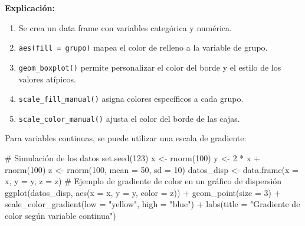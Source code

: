 \documentclass[
  spanish,
  a4paper,
  DIV=11,
  numbers=noendperiod,
  onepage,
  openany]{scrreprt}
\newenvironment{Shaded}{\begin{snugshade}}{\end{snugshade}}
\newcommand{\AttributeTok}[1]{\textcolor[rgb]{0.40,0.45,0.13}{#1}}
\newcommand{\CommentTok}[1]{\textcolor[rgb]{0.37,0.37,0.37}{#1}}
\newcommand{\DecValTok}[1]{\textcolor[rgb]{0.68,0.00,0.00}{#1}}
\newcommand{\FunctionTok}[1]{\textcolor[rgb]{0.28,0.35,0.67}{#1}}
\newcommand{\NormalTok}[1]{\textcolor[rgb]{0.00,0.23,0.31}{#1}}
\newcommand{\OtherTok}[1]{\textcolor[rgb]{0.00,0.23,0.31}{#1}}
\newcommand{\SpecialCharTok}[1]{\textcolor[rgb]{0.37,0.37,0.37}{#1}}
\newcommand{\StringTok}[1]{\textcolor[rgb]{0.13,0.47,0.30}{#1}}
\begin{document}
\textbf{Explicación:}

\begin{enumerate}
\def\labelenumi{\arabic{enumi}.}
\item
  Se crea un data frame con variables categórica y numérica.
\item
  \texttt{aes(fill\ =\ grupo)} mapea el color de relleno a la variable
  de grupo.
\item
  \texttt{geom\_boxplot()} permite personalizar el color del borde y el
  estilo de los valores atípicos.
\item
  \texttt{scale\_fill\_manual()} asigna colores específicos a cada
  grupo.
\item
  \texttt{scale\_color\_manual()} ajusta el color del borde de las
  cajas.
\end{enumerate}

Para variables continuas, se puede utilizar una escala de gradiente:

\begin{Shaded}
\begin{Highlighting}[]
\CommentTok{\# Simulación de los datos}
\FunctionTok{set.seed}\NormalTok{(}\DecValTok{123}\NormalTok{)}
\NormalTok{x }\OtherTok{\textless{}{-}} \FunctionTok{rnorm}\NormalTok{(}\DecValTok{100}\NormalTok{)}
\NormalTok{y }\OtherTok{\textless{}{-}} \DecValTok{2} \SpecialCharTok{*}\NormalTok{ x }\SpecialCharTok{+} \FunctionTok{rnorm}\NormalTok{(}\DecValTok{100}\NormalTok{)}
\NormalTok{z }\OtherTok{\textless{}{-}} \FunctionTok{rnorm}\NormalTok{(}\DecValTok{100}\NormalTok{, }\AttributeTok{mean =} \DecValTok{50}\NormalTok{, }\AttributeTok{sd =} \DecValTok{10}\NormalTok{)}
\NormalTok{datos\_disp }\OtherTok{\textless{}{-}} \FunctionTok{data.frame}\NormalTok{(}\AttributeTok{x =}\NormalTok{ x, }\AttributeTok{y =}\NormalTok{ y, }\AttributeTok{z =}\NormalTok{ z)}
\CommentTok{\# Ejemplo de gradiente de color en un gráfico de dispersión}
\FunctionTok{ggplot}\NormalTok{(datos\_disp, }\FunctionTok{aes}\NormalTok{(}\AttributeTok{x =}\NormalTok{ x, }\AttributeTok{y =}\NormalTok{ y, }\AttributeTok{color =}\NormalTok{ z)) }\SpecialCharTok{+}
  \FunctionTok{geom\_point}\NormalTok{(}\AttributeTok{size =} \DecValTok{3}\NormalTok{) }\SpecialCharTok{+}
  \FunctionTok{scale\_color\_gradient}\NormalTok{(}\AttributeTok{low =} \StringTok{"yellow"}\NormalTok{, }\AttributeTok{high =} \StringTok{"blue"}\NormalTok{) }\SpecialCharTok{+}
  \FunctionTok{labs}\NormalTok{(}\AttributeTok{title =} \StringTok{"Gradiente de color según variable continua"}\NormalTok{)}
\end{Highlighting}
\end{Shaded}
\end{document}
